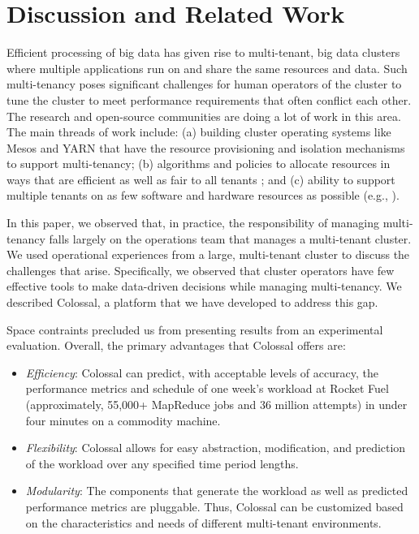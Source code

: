 
\section{Discussion and Related Work}
\label{sec:sec4}

Efficient processing of big data has given rise to multi-tenant, big data clusters where multiple applications run on and share the same resources and data. Such multi-tenancy poses significant challenges for human operators of the cluster to tune the cluster to meet performance requirements that often conflict each other. The research and open-source communities 
are doing a lot of work in this area. The main threads of 
work include: (a) building cluster operating systems 
like Mesos \cite{mesos} and YARN \cite{yarn}
that have the resource provisioning and 
isolation mechanisms to support multi-tenancy; (b) 
algorithms and policies to allocate resources in ways that are 
efficient as well as fair to all tenants \cite{conf/cidr/NarasayyaDSCC13,ghodsi11,isard09}; and (c) ability to support multiple tenants
on as few software and hardware resources as possible 
(e.g., \cite{DBLP:journals/pvldb/DasNLS13}).

In this paper, we observed that, in practice, the responsibility 
of managing multi-tenancy falls largely on the operations team that 
manages a  multi-tenant cluster. 
We used operational experiences from a large, multi-tenant 
cluster to discuss the challenges that arise. Specifically, 
we observed that cluster operators have 
few effective tools to make data-driven decisions
while managing multi-tenancy. We described 
Colossal, a platform that we have developed to address this gap. 

Space contraints precluded us from presenting results from an experimental
evaluation. Overall, the primary advantages that Colossal 
offers are: 
\begin{itemize}

\item{\em Efficiency}: Colossal can predict, with acceptable 
levels of accuracy, the performance metrics and schedule
of one week's workload at Rocket Fuel 
(approximately, 55,000+ MapReduce jobs and 36 million attempts) in
under four minutes on a commodity machine.

\item{\em Flexibility}: Colossal allows for easy abstraction, modification, 
and prediction of the workload over any specified time period lengths.

\item{\em Modularity}: The components that generate the 
workload as well as predicted performance metrics
are pluggable. Thus, Colossal can be customized based on the 
characteristics and needs of different multi-tenant environments. 

\end{itemize}


